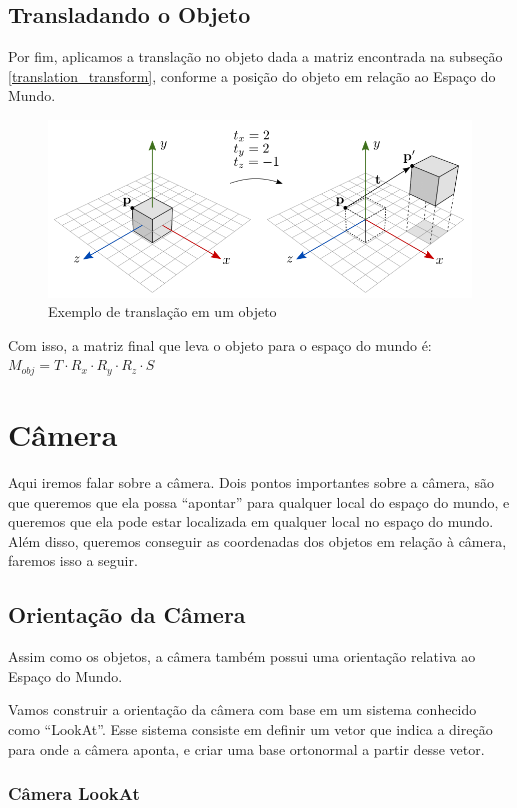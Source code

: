 \documentclass[12pt]{article}
\begin{document}
\subsection{Transladando o Objeto}

Por fim, aplicamos a translação no objeto dada a matriz encontrada na subseção {\ref{translation_transform}}, conforme a posição do objeto em relação ao Espaço do Mundo.

\begin{figure}[H]
    \centering
    \includegraphics[width=0.6\linewidth]{imgs/07_translation1.png}
    \caption{Exemplo de translação em um objeto}
\end{figure}

\noindent
Com isso, a matriz final que leva o objeto para o espaço do mundo é:
\\[\baselineskip]
\boldmath{}
$M_{obj} = T \cdot R_x \cdot R_y \cdot R_z \cdot S$
\unboldmath{}

\section{Câmera}

Aqui iremos falar sobre a câmera. Dois pontos importantes sobre a câmera, são que queremos que ela possa ``apontar'' para qualquer local do espaço do mundo, e queremos que ela pode estar localizada em qualquer local no espaço do mundo. Além disso, queremos conseguir as coordenadas dos objetos em relação à câmera, faremos isso a seguir.

\subsection{Orientação da Câmera}

Assim como os objetos, a câmera também possui uma orientação relativa ao Espaço do Mundo. 

Vamos construir a orientação da câmera com base em um sistema conhecido como ``LookAt''. Esse sistema consiste em definir um vetor que indica a direção para onde a câmera aponta, e criar uma base ortonormal a partir desse vetor.

\subsubsection{Câmera LookAt}
\end{document}
